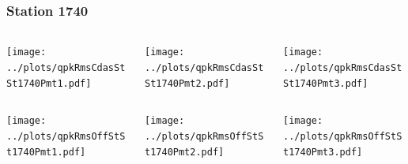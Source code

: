 \documentclass[aspectratio=169]{beamer}
\begin{document}
\begin{frame} 
  \frametitle{Station 1740}
  \begin{center}
    \begin{columns}
      \begin{column}{0.33\textwidth}
        \texttt{[image: ../plots/qpkRmsCdasStSt1740Pmt1.pdf]}
      \end{column}
      \begin{column}{0.33\textwidth}
        \texttt{[image: ../plots/qpkRmsCdasStSt1740Pmt2.pdf]}
      \end{column}
      \begin{column}{0.33\textwidth}
        \texttt{[image: ../plots/qpkRmsCdasStSt1740Pmt3.pdf]}
      \end{column}
    \end{columns}
  \end{center}

  \begin{center}
    \begin{columns}
      \begin{column}{0.33\textwidth}
        \texttt{[image: ../plots/qpkRmsOffStSt1740Pmt1.pdf]}
      \end{column}
      \begin{column}{0.33\textwidth}
        \texttt{[image: ../plots/qpkRmsOffStSt1740Pmt2.pdf]}
      \end{column}
      \begin{column}{0.33\textwidth}
        \texttt{[image: ../plots/qpkRmsOffStSt1740Pmt3.pdf]}
      \end{column}
    \end{columns}
  \end{center}
\end{frame}
\end{document}
